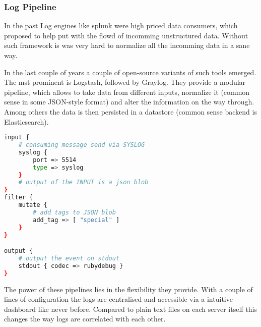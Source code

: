 \subsubsection{Log Pipeline}
In the past Log engines like splunk were high priced data consumers, which proposed to help put with the
flowd of incomming unstructured data. Without such framework is was very hard to normalize all the incomming data in a sane way.

In the last couple of years a couple of open-source variants of such tools emerged. The mst prominent is Logstash, followed by Graylog.
They provide a modular pipeline, which allows to take data from different inputs, normalize it (common sense in some JSON-style format)
and alter the information on the way through. Among others the data is then persisted in a datastore (common sense backend is Elasticsearch).



\begin{lstlisting}[language=bash,
    caption={Basic Logstash configuration},
    label={lst:ls_cfg}]
input {
    # consuming message send via SYSLOG
    syslog {
        port => 5514
        type => syslog
    }
    # output of the INPUT is a json blob
}
filter {
    mutate {
        # add tags to JSON blob
        add_tag => [ "special" ]
    }
}

output {
    # output the event on stdout
    stdout { codec => rubydebug }
}
\end{lstlisting}

The power of these pipelines lies in the flexibility they provide. With a couple of lines of configuration the logs are centralised and accessible
via a intuitive dashboard like never before. Compared to plain text files on each server itself this changes the way logs are correlated with each other.

